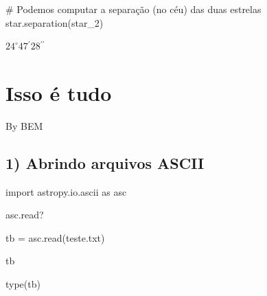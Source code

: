 \documentclass[
  letterpaper,
  DIV=11,
  numbers=noendperiod]{scrreprt}
\newenvironment{Shaded}{\begin{snugshade}}{\end{snugshade}}
\newcommand{\BuiltInTok}[1]{\textcolor[rgb]{0.00,0.23,0.31}{#1}}
\newcommand{\CommentTok}[1]{\textcolor[rgb]{0.37,0.37,0.37}{#1}}
\newcommand{\ImportTok}[1]{\textcolor[rgb]{0.00,0.46,0.62}{#1}}
\newcommand{\NormalTok}[1]{\textcolor[rgb]{0.00,0.23,0.31}{#1}}
\newcommand{\OperatorTok}[1]{\textcolor[rgb]{0.37,0.37,0.37}{#1}}
\newcommand{\StringTok}[1]{\textcolor[rgb]{0.13,0.47,0.30}{#1}}
\begin{document}
\begin{Shaded}
\begin{Highlighting}[]
\CommentTok{\# Podemos computar a separação (no céu) das duas estrelas}
\NormalTok{star.separation(star\_2)}
\end{Highlighting}
\end{Shaded}

$24^\circ47{}^\prime28{}^{\prime\prime}$

\chapter{Isso é tudo}\label{isso-uxe9-tudo-1}

By BEM

\section{1) Abrindo arquivos ASCII}\label{abrindo-arquivos-ascii}

\begin{Shaded}
\begin{Highlighting}[]
\ImportTok{import}\NormalTok{ astropy.io.}\BuiltInTok{ascii} \ImportTok{as}\NormalTok{ asc}
\end{Highlighting}
\end{Shaded}

\begin{Shaded}
\begin{Highlighting}[]
\NormalTok{asc.read?}
\end{Highlighting}
\end{Shaded}

\begin{Shaded}
\begin{Highlighting}[]
\NormalTok{tb }\OperatorTok{=}\NormalTok{ asc.read(}\StringTok{\textquotesingle{}teste.txt\textquotesingle{}}\NormalTok{)}
\end{Highlighting}
\end{Shaded}

\begin{Shaded}
\begin{Highlighting}[]
\NormalTok{tb}
\end{Highlighting}
\end{Shaded}

\begin{Shaded}
\begin{Highlighting}[]
\BuiltInTok{type}\NormalTok{(tb)}
\end{Highlighting}
\end{Shaded}
\end{document}
